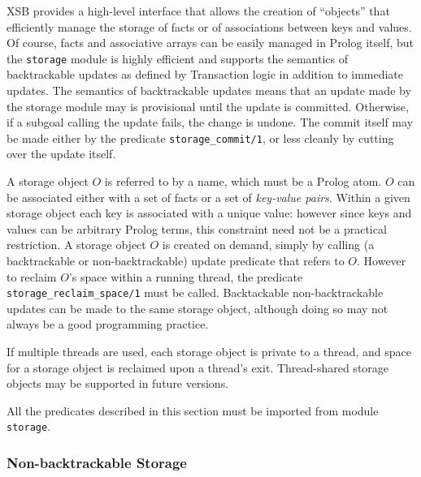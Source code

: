XSB provides a high-level interface that allows the creation of
``objects'' that efficiently manage the storage of facts or of
associations between keys and values.  Of course, facts and
associative arrays can be easily managed in Prolog itself, but the
{\tt storage} module is highly efficient and supports the semantics of
backtrackable updates as defined by Transaction logic \cite{BoKi94} in
addition to immediate updates.  The semantics of backtrackable updates
means that an update made by the storage module may is provisional
until the update is committed.  Otherwise, if a subgoal calling the
update fails, the change is undone. The commit itself may be made
either by the predicate {\tt storage\_commit/1}, or less cleanly by
cutting over the update itself.

A storage object $O$ is referred to by a name, which must be a
Prolog atom.  $O$ can be associated either with a set of facts or a
set of \emph{key-value pairs}.  Within a given storage object each key
is associated with a unique value: however since keys and values can
be arbitrary Prolog terms, this constraint need not be a practical
restriction.  A storage object $O$ is created on demand, simply by
calling (a backtrackable or non-backtrackable) update predicate that
refers to $O$.  However to reclaim $O$'s space within a running
thread, the predicate {\tt storage\_reclaim\_space/1} must be called.
Backtackable non-backtrackable updates can be made to the same storage
object, although doing so may not always be a good programming practice.

If multiple threads are used, each storage object is private to a
thread, and space for a storage object is reclaimed upon a thread's
exit.  Thread-shared storage objects may be supported in future
versions.

All the predicates described in this section must be imported from
module {\tt storage}.

\subsubsection{Non-backtrackable Storage}

